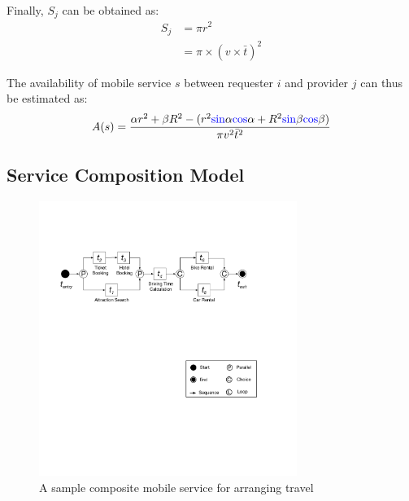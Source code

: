 \documentclass[journal]{IEEEtran}
\begin{document}
Finally, $S_j$ can be obtained as:
\begin{align}
S_j & = \pi r^2 \\\nonumber
& = \pi \times (v \times \bar{t})^2
\end{align}

The availability of mobile service $s$ between requester $i$ and provider $j$ can thus be estimated as:
\begin{align}
A(s) = \frac{\alpha r^2 + \beta R^2 - (r^2 {\color{blue}{\sin}}\alpha {\color{blue}{\cos}}\alpha + R^2 {\color{blue}{\sin}}\beta {\color{blue}{\cos}}\beta)}{\pi v^2 \bar{t}^2}
\end{align}

\subsection{Service Composition Model}
\begin{figure}[!t]
\centering
\includegraphics[width=3.3in]{./img/pic4.pdf}
\caption{A sample composite mobile service for arranging travel}
\label{A sample composite mobile service}
\end{figure}
\end{document}
